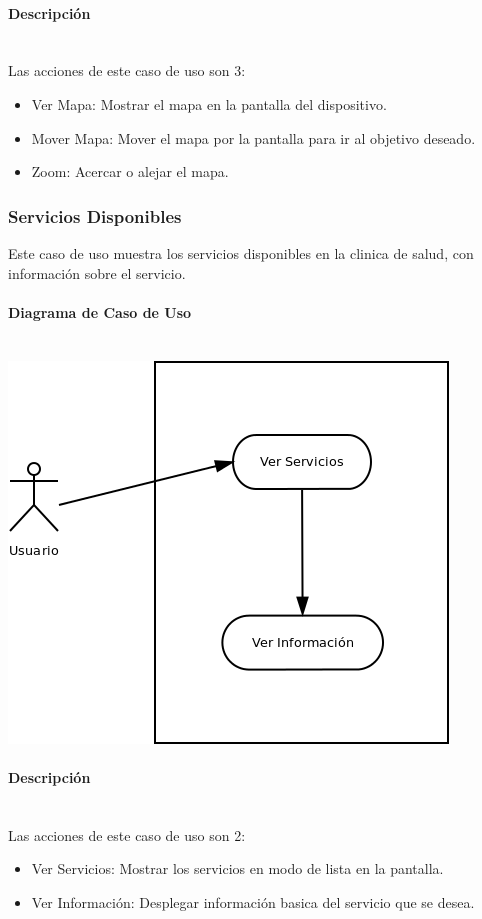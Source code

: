 \documentclass[12pt]{article}
\begin{document}
\paragraph{Descripci\'on}\ \\
Las acciones de este caso de uso son 3:
\begin{itemize}
	\item{Ver Mapa: Mostrar el mapa en la pantalla del dispositivo.}
	\item{Mover Mapa: Mover el mapa por la pantalla para ir al objetivo deseado.}
	\item{Zoom: Acercar o alejar el mapa.}
\end{itemize}

\subsubsection{Servicios Disponibles}
Este caso de uso muestra los servicios disponibles en la clinica de salud, con informaci\'on sobre el servicio.

\paragraph{Diagrama de Caso de Uso}\ \\
\includegraphics[scale=0.6]{"../Documentos/Diagramas/CU2_"}

\paragraph{Descripci\'on}\ \\
Las acciones de este caso de uso son 2:
\begin{itemize}
	\item{Ver Servicios: Mostrar los servicios en modo de lista en la pantalla.}
	\item{Ver Informaci\'on: Desplegar informaci\'on basica del servicio que se desea.}
\end{itemize}
\end{document}
